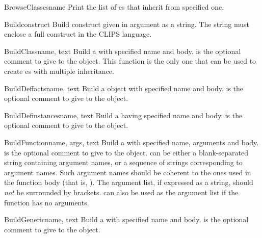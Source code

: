 \begin{funcdesc}{BrowseClasses}{name}
Print the list of es that inherit from specified one.
\end{funcdesc}

\begin{funcdesc}{Build}{construct}
Build construct given in argument as a string. The string must enclose
a full construct in the CLIPS language.
\end{funcdesc}

\begin{funcdesc}{BuildClass}{name, text }
Build a  with specified name and body.  is
the optional comment to give to the object. This function is the only
one that can be used to create es with multiple
inheritance.
\end{funcdesc}

\begin{funcdesc}{BuildDeffacts}{name, text }
Build a  object with specified name and body.
 is the optional comment to give to the object.
\end{funcdesc}

\begin{funcdesc}{BuildDefinstances}{name, text }
Build a  having specified name and body.
 is the optional comment to give to the object.
\end{funcdesc}

\begin{funcdesc}{BuildFunction}{name, args, text }
Build a  with specified name, arguments and body.
 is the optional comment to give to the object. 
can be either a blank-separated string containing argument names, or
a sequence of strings corresponding to argument names. Such argument
names should be coherent to the ones used in the function body (that is,
). The argument list, if expressed as a string, should
\emph{not} be surrounded by brackets.  can also be used as
the argument list if the function has no arguments.
\end{funcdesc}

\begin{funcdesc}{BuildGeneric}{name, text }
Build a  with specified name and body.  is
the optional comment to give to the object.
\end{funcdesc}

